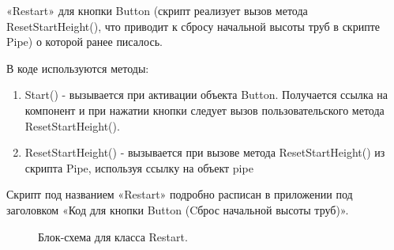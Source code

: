 \documentclass[14pt, oneside]{altsu-report}
\begin{document}
«Restart» для кнопки Button (скрипт реализует вызов метода ResetStartHeight(), что приводит к сбросу начальной высоты труб в скрипте Pipe) о которой ранее писалось. 

В коде используются методы:

\begin{enumerate}
\item Start() - вызывается при активации объекта Button. Получается ссылка на компонент и при нажатии кнопки следует вызов пользовательского метода ResetStartHeight().
\item ResetStartHeight() - вызывается при вызове метода ResetStartHeight() из скрипта Pipe, используя ссылку на объект pipe
\end{enumerate} 

Скрипт под названием «Restart» подробно расписан в приложении под заголовком «Код для кнопки Button (Cброс начальной высоты труб)».


\begin{figure}[H]
\caption{Блок-схема для класса Restart.}
\end{figure}
\end{document}
